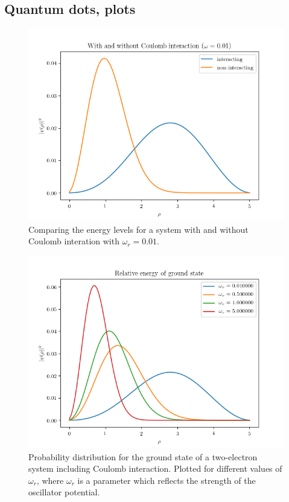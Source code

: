 \documentclass[a4paper, fontsize=11pt]{article}
\begin{document}
\subsection{Quantum dots, plots}


\begin{figure}[H]
\includegraphics[scale=0.8]{interaction.png}
\caption{Comparing the energy levels for a system with and without Coulomb interation with $\omega_{r}=0.01$.}
\label{Coulomb}
\end{figure}


\begin{figure}
\includegraphics[scale=0.8]{twoelectrons.png}
\caption{Probability distribution for the ground state of a two-electron system including Coulomb interaction. Plotted for different values of $\omega_{r}$, where $\omega_{r}$ is a parameter which reflects the strength of the oscillator potential.}
\label{two-electron}
\end{figure}
\end{document}
